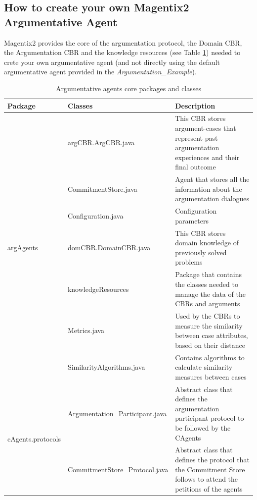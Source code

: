 \subsection{How to create your own Magentix2 Argumentative Agent}
\label{subsubsec:howToCreate}

Magentix2 provides the core of the argumentation protocol, the Domain CBR, the Argumentation CBR and the knowledge resources (see Table \ref{tab:argAgentsCore}) needed to crete your own argumentative agent (and not directly using the default argumentative agent provided in the \textit{Argumentation\_Example}).

\begin{table}[h!t]
\begin{tabular}{|l|l|p{5cm}|}
\hline
\textbf{Package} & \textbf{Classes} & \textbf{Description} \\ \hline

\multirow{7}{*}{argAgents}  & argCBR.ArgCBR.java & This CBR stores argument-cases that represent past argumentation experiences and their final outcome \\
 & CommitmentStore.java & Agent that stores all the information about the argumentation dialogues \\
 & Configuration.java & Configuration parameters \\
 & domCBR.DomainCBR.java &  This CBR stores domain knowledge of previously solved problems \\
 & knowledgeResources &  Package that contains the classes needed to manage the data of the CBRs and arguments \\
 & Metrics.java & Used by the CBRs to measure the similarity between case attributes, based on their distance \\
 & SimilarityAlgorithms.java & Contains algorithms to calculate similarity measures between cases \\ \hline
\multirow{2}{*}{cAgents.protocols} & Argumentation\_Participant.java & Abstract class that defines the argumentation participant protocol to be followed by the CAgents \\
 & CommitmentStore\_Protocol.java & Abstract class that defines the protocol that the Commitment Store follows to attend the petitions of the agents \\ \hline

\end{tabular}
\caption{Argumentative agents core packages and classes}
\label{tab:argAgentsCore}
\end{table}

